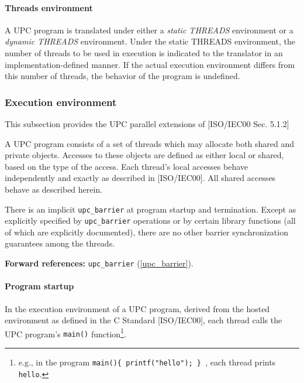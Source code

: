 \paragraph{Threads environment}
\npf A UPC program is translated under either a {\em static
      THREADS} environment or a {\em dynamic THREADS} environment. Under
      the static THREADS environment, the number of threads to be
      used in execution is indicated to the translator in an
      implementation-defined manner. If the actual execution
      environment differs from this number of threads, the behavior of
      the program is undefined.
       
\subsubsection{Execution environment}

\npf This subsection provides the UPC parallel extensions of
   [ISO/IEC00 Sec. 5.1.2]
   
\np A UPC program consists of a set of threads which may
      allocate both shared and private objects.  
      Accesses to these objects are defined as either
      local or shared, based on the type of the access.  Each thread's local
      accesses behave independently and exactly as described in 
      [ISO/IEC00].  All shared accesses behave as described herein.

\np There is an implicit {\tt upc\_barrier} at program startup
     and termination.  Except as explicitly specified by {\tt upc\_barrier} operations
     or by certain library functions (all of which are explicitly documented), there
     are no other barrier synchronization guarantees among the threads.

       {\bf Forward references:} {\tt upc\_barrier} (\ref{upc_barrier}).  

\paragraph{Program startup}

\npf In the execution environment of a UPC program, derived
      from the hosted environment as defined in the C Standard [ISO/IEC00],
      each thread calls the UPC program's {\tt main()}
      function\footnote{e.g., in the program {\tt main()\{
      printf("hello"); \} }, each thread prints {\tt hello}.}.

